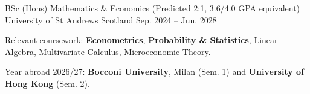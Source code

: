 \begin{cventries}
  \cventry
    {BSc (Hons) Mathematics \& Economics (Predicted 2:1, 3.6/4.0 GPA equivalent)}
    {University of St Andrews}
    {Scotland}
    {Sep. 2024 -- Jun. 2028}
    {
      \begin{cvitems}
        \item {Relevant coursework: \textbf{Econometrics}, \textbf{Probability \& Statistics}, Linear Algebra, Multivariate Calculus, Microeconomic Theory.}
        \item {Year abroad 2026/27: \textbf{Bocconi University}, Milan (Sem. 1) and \textbf{University of Hong Kong} (Sem. 2).}
      \end{cvitems}
    }
\end{cventries}
